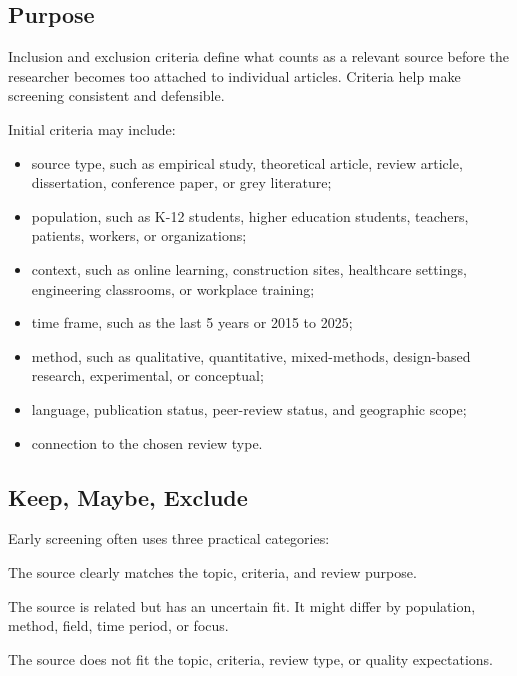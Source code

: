 \documentclass[11pt,letterpaper]{article}
\begin{document}
\subsection{Purpose}

Inclusion and exclusion criteria define what counts as a relevant source before the researcher becomes too attached to individual articles. Criteria help make screening consistent and defensible.

Initial criteria may include:

\begin{itemize}
  \item source type, such as empirical study, theoretical article, review article, dissertation, conference paper, or grey literature;
  \item population, such as K-12 students, higher education students, teachers, patients, workers, or organizations;
  \item context, such as online learning, construction sites, healthcare settings, engineering classrooms, or workplace training;
  \item time frame, such as the last 5 years or 2015 to 2025;
  \item method, such as qualitative, quantitative, mixed-methods, design-based research, experimental, or conceptual;
  \item language, publication status, peer-review status, and geographic scope;
  \item connection to the chosen review type.
\end{itemize}

\subsection{Keep, Maybe, Exclude}

Early screening often uses three practical categories:

\begin{description}[leftmargin=1.15in,style=nextline]
  \item[Keep] The source clearly matches the topic, criteria, and review purpose.
  \item[Maybe] The source is related but has an uncertain fit. It might differ by population, method, field, time period, or focus.
  \item[Exclude] The source does not fit the topic, criteria, review type, or quality expectations.
\end{description}
\end{document}
